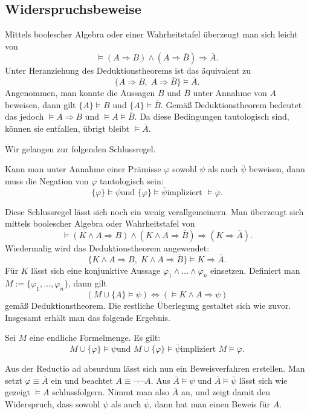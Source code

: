 \newpage
\subsection{Widerspruchsbeweise}
Mittels boolescher Algebra oder einer Wahrheitstafel überzeugt man
sich leicht von
\[\models (A\Rightarrow B)\land (A\Rightarrow\overline B)\Rightarrow\overline A.\]
Unter Heranziehung des Deduktionstheorems ist das äquivalent zu
\[\{A\Rightarrow B,\;A\Rightarrow\overline B\}\models\overline A.\]
Angenommen, man konnte die Aussagen $B$ und $\overline B$
unter Annahme von $A$ beweisen, dann gilt $\{A\}\models B$
und $\{A\}\models\overline B$. Gemäß Deduktionstheorem
bedeutet das jedoch $\models A\Rightarrow B$ und
$\models A\models\overline B$. Da diese Bedingungen tautologisch
sind, können sie entfallen, übrigt bleibt $\models\overline A$.

Wir gelangen zur folgenden Schlussregel.

\begin{Satz}
Kann man unter Annahme einer Prämisse $\varphi$ sowohl
$\psi$ als auch $\overline\psi$ beweisen, dann muss
die Negation von $\varphi$ tautologisch sein:
\[\text{$\{\varphi\}\models\psi$
und $\{\varphi\}\models\overline\psi$
impliziert $\models\overline\varphi$}.\]
\end{Satz}

\noindent
Diese Schlussregel lässt sich noch ein wenig verallgemeinern.
Man überzeugt sich mittels boolescher Algebra oder Wahrheitstafel von
\[\models (K\land A\Rightarrow B)\land (K\land A\Rightarrow\overline B)
\Rightarrow (K\Rightarrow\overline A).\]
Wiedermalig wird das Deduktionstheorem angewendet:
\[\{K\land A\Rightarrow B,\;K\land A\Rightarrow\overline B\}
\models K\Rightarrow\overline A.\]
Für $K$ lässt sich eine konjunktive Aussage
$\varphi_1\land\ldots\land\varphi_n$ einsetzen.
Definiert man $M:=\{\varphi_1,\ldots,\varphi_n\}$, dann gilt
\[(M\cup\{A\}\models\psi)\iff (\models K\land A\Rightarrow\psi)\]
gemäß Deduktionstheorem. Die restliche Überlegung gestaltet
sich wie zuvor. Insgesamt erhält man das folgende Ergebnis.
\begin{Satz}
Sei $M$ eine endliche Formelmenge. Es gilt:
\[\text{$M\cup\{\varphi\}\models\psi$
und $M\cup\{\varphi\}\models\overline\psi$
impliziert $M\models\overline\varphi$}.\]
\end{Satz}

\noindent
Aus der Reductio ad absurdum lässt sich nun ein
Beweisverfahren erstellen. Man setzt $\varphi\equiv\overline A$ ein
und beachtet $A\equiv\neg\neg A$. Aus $\overline A\models\psi$
und $\overline A\models\overline\psi$ lässt sich wie gezeigt
$\models A$ schlussfolgern. Nimmt man also $\overline A$ an,
und zeigt damit den Widerspruch, dass sowohl $\psi$ als auch
$\overline\psi$, dann hat man einen Beweis für $A$.

